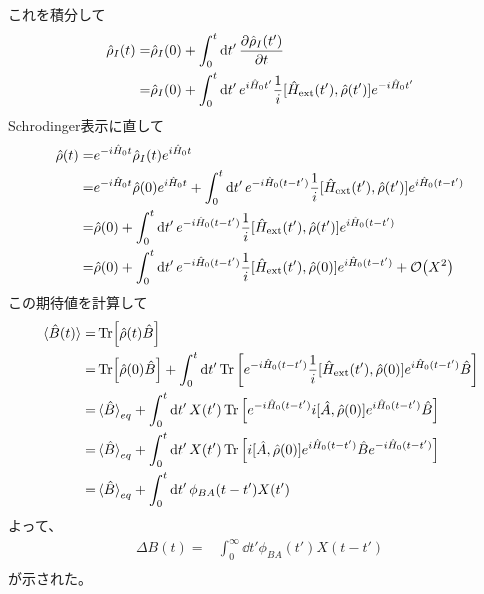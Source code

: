 \documentclass{ltjsarticle}
\begin{document}
これを積分して
\begin{align}
  \hat{\rho}_I(t)=&\hat{\rho}_I(0)+\int_0^t\dd{t'}\pdv{\hat{\rho}_I(t')}{t}\\
  =&\hat{\rho}_I(0)+\int_0^t\dd{t'}e^{i\hat{H}_0t'}\frac{1}{i}[\hat{H}_{\textrm{ext}}(t'),\hat{\rho}(t')]e^{-i\hat{H}_0t'}\\
\end{align}
Schrodinger表示に直して
\begin{align}
  \hat{\rho}(t)=&e^{-i\hat{H}_0t}\hat{\rho}_I(t)e^{i\hat{H}_0t}\\
  =&e^{-i\hat{H}_0t}\hat{\rho}(0)e^{i\hat{H}_0t}+\int_0^t\dd{t'}e^{-i\hat{H}_0(t-t')}\frac{1}{i}[\hat{H}_{\textrm{ext}}(t'),\hat{\rho}(t')]e^{i\hat{H}_0(t-t')}\\
  =&\hat{\rho}(0)+\int_0^t\dd{t'}e^{-i\hat{H}_0(t-t')}\frac{1}{i}[\hat{H}_{\textrm{ext}}(t'),\hat{\rho}(t')]e^{i\hat{H}_0(t-t')}\\
  =&\hat{\rho}(0)+\int_0^t\dd{t'}e^{-i\hat{H}_0(t-t')}\frac{1}{i}[\hat{H}_{\textrm{ext}}(t'),\hat{\rho}(0)]e^{i\hat{H}_0(t-t')}+\order{X^2}\\
\end{align}
この期待値を計算して
\begin{align}
  \ev*{\hat{B}(t)}=&\Tr[\hat{\rho}(t)\hat{B}]\\
  =&\Tr[\hat{\rho}(0)\hat{B}]+\int_0^t\dd{t'}\Tr\left[e^{-i\hat{H}_0(t-t')}\frac{1}{i}[\hat{H}_{\textrm{ext}}(t'),\hat{\rho}(0)]e^{i\hat{H}_0(t-t')}\hat{B}\right]\\
  =&\ev*{\hat{B}}_{eq}+\int_0^t\dd{t'}X(t')\Tr\left[e^{-i\hat{H}_0(t-t')}i[\hat{A},\hat{\rho}(0)]e^{i\hat{H}_0(t-t')}\hat{B}\right]\\
  =&\ev*{\hat{B}}_{eq}+\int_0^t\dd{t'}X(t')\Tr\left[i[\hat{A},\hat{\rho}(0)]e^{i\hat{H}_0(t-t')}\hat{B}e^{-i\hat{H}_0(t-t')}\right]\\
  =&\ev*{\hat{B}}_{eq}+\int_0^t\dd{t'}\phi_{BA}(t-t')X(t')\\
\end{align}
よって、
\begin{align}
  \Delta B(t)=&\int^\infty_0\dd{t'}\phi_{BA}(t')X(t-t')\\
\end{align}
が示された。
\end{document}
